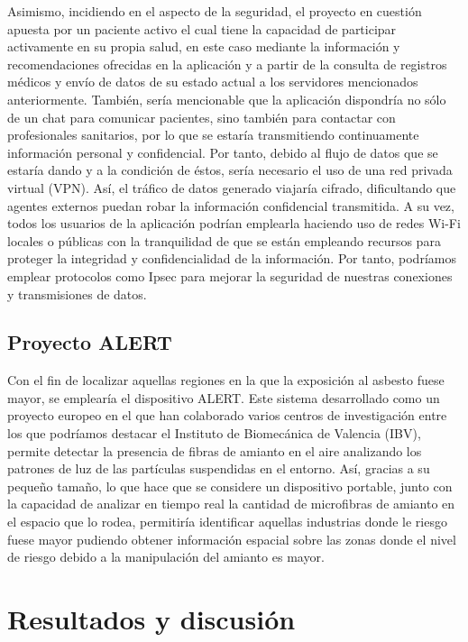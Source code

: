 \documentclass{article}
\begin{document}
Asimismo, incidiendo en el aspecto de la  seguridad,  el  proyecto  en
cuestión apuesta por un paciente activo el cual tiene la capacidad  de
participar activamente en su propia salud, en este  caso  mediante  la
información y recomendaciones ofrecidas en la aplicación y a partir de
la consulta de registros médicos y envío de datos de su estado	actual
a los servidores mencionados anteriormente. También, sería mencionable
que la aplicación  dispondría  no  sólo  de  un  chat  para  comunicar
pacientes, sino también para contactar con  profesionales  sanitarios,
por lo que se estaría transmitiendo continuamente información personal
y confidencial.  Por tanto, debido al flujo de datos  que  se  estaría
dando y a la condición de éstos, sería necesario el  uso  de  una  red
privada virtual (VPN).	Así, el tráfico  de  datos  generado  viajaría
cifrado, dificultando que agentes externos puedan robar la información
confidencial  transmitida.   A	su  vez,  todos  los  usuarios	de  la
aplicación podrían emplearla haciendo uso de  redes  Wi-Fi  locales  o
públicas con la tranquilidad de que se están empleando	recursos  para
proteger la integridad y  confidencialidad  de	la  información.   Por
tanto,	podríamos  emplear  protocolos	como  Ipsec  para  mejorar  la
seguridad  de  nuestras   conexiones   y   transmisiones   de	datos.

\subsection{Proyecto ALERT}

Con el fin de localizar aquellas regiones en la que la	exposición  al
asbesto fuese mayor, se emplearía el dispositivo ALERT.  Este  sistema
desarrollado como un proyecto europeo en el que han colaborado	varios
centros de investigación entre los que podríamos destacar el Instituto
de Biomecánica de Valencia (IBV), permite  detectar  la  presencia  de
fibras de amianto en el aire analizando los patrones  de  luz  de  las
partículas suspendidas en el  entorno.	 Así,  gracias	a  su  pequeño
tamaño, lo que hace que se considere un  dispositivo  portable,  junto
con la capacidad de analizar en tiempo real la cantidad de microfibras
de amianto en el espacio que lo rodea, permitiría identificar aquellas
industrias donde le riesgo fuese mayor	pudiendo  obtener  información
espacial sobre las  zonas  donde  el  nivel  de  riesgo  debido  a  la
manipulación del amianto es mayor.

\section{Resultados y discusión}
\end{document}
